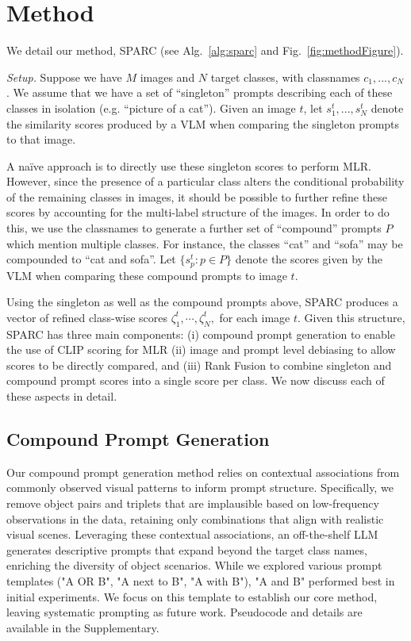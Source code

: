 \section{Method}
\label{sec:method}


We detail our method, SPARC (see Alg.~\ref{alg:sparc} and Fig.~\ref{fig:methodFigure}).



\noindent \emph{Setup.} %
Suppose we have $M$ images and $N$ target classes, with classnames $c_1,...,c_N$. We assume that we have a set of ``singleton'' prompts describing each of these classes in isolation (e.g. ``picture of a cat''). Given an image $t$, let $s_1^t,...,s_N^t$ denote the similarity scores produced by a VLM when comparing the singleton prompts to that image.

A na\"{i}ve approach is to directly use these singleton scores to perform MLR. However, since the presence of a particular class alters the conditional probability of the remaining classes in images, it should be possible to further refine these scores by accounting for the multi-label structure of the images. In order to do this, we use the classnames to generate a further set of ``compound'' prompts $P$ which mention multiple classes. For instance, the classes ``cat'' and ``sofa'' may be compounded to ``cat and sofa''. Let $\{s_p^t : p \in P\}$ denote the scores given by the VLM when comparing these compound prompts to image $t$.

Using the singleton as well as the compound prompts above, SPARC produces a vector of refined class-wise scores $\zeta_1^t, \cdots, \zeta_N^t,$ for each image $t$. Given this structure, SPARC has three main components: (i) compound prompt generation to enable the use of CLIP scoring for MLR (ii) image and prompt level debiasing to allow scores to be directly compared, and (iii) Rank Fusion to combine singleton and compound prompt scores into a single score per class. We now discuss each of these aspects in detail. 

\subsection{Compound Prompt Generation}
Our compound prompt generation method relies on contextual associations from commonly observed visual patterns to inform prompt structure. Specifically, we remove object pairs and triplets that are implausible based on low-frequency observations in the data, retaining only combinations that align with realistic visual scenes. Leveraging these contextual associations, an off-the-shelf LLM generates descriptive prompts that expand beyond the target class names, enriching the diversity of object scenarios. While we explored various prompt templates ("A OR B", "A next to B", "A with B"), "A and B" performed best in initial experiments. We focus on this template to establish our core method, leaving systematic prompting as future work.
Pseudocode and details are available in the Supplementary.

